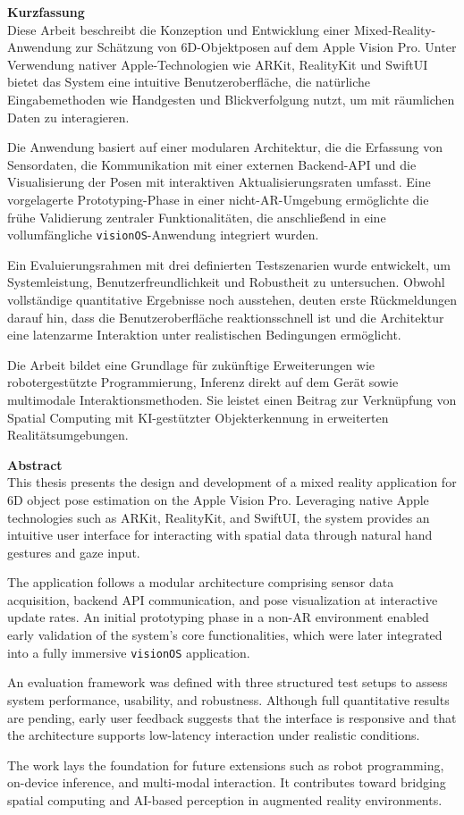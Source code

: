 \textbf{\Large Kurzfassung}\\

Diese Arbeit beschreibt die Konzeption und Entwicklung einer Mixed-Reality-Anwendung zur Schätzung von 6D-Objektposen auf dem Apple Vision Pro. Unter Verwendung nativer Apple-Technologien wie ARKit, RealityKit und SwiftUI bietet das System eine intuitive Benutzeroberfläche, die natürliche Eingabemethoden wie Handgesten und Blickverfolgung nutzt, um mit räumlichen Daten zu interagieren.

Die Anwendung basiert auf einer modularen Architektur, die die Erfassung von Sensordaten, die Kommunikation mit einer externen Backend-API und die Visualisierung der Posen mit interaktiven Aktualisierungsraten umfasst. Eine vorgelagerte Prototyping-Phase in einer nicht-AR-Umgebung ermöglichte die frühe Validierung zentraler Funktionalitäten, die anschließend in eine vollumfängliche \texttt{visionOS}-Anwendung integriert wurden.

Ein Evaluierungsrahmen mit drei definierten Testszenarien wurde entwickelt, um Systemleistung, Benutzerfreundlichkeit und Robustheit zu untersuchen. Obwohl vollständige quantitative Ergebnisse noch ausstehen, deuten erste Rückmeldungen darauf hin, dass die Benutzeroberfläche reaktionsschnell ist und die Architektur eine latenzarme Interaktion unter realistischen Bedingungen ermöglicht.

Die Arbeit bildet eine Grundlage für zukünftige Erweiterungen wie robotergestützte Programmierung, Inferenz direkt auf dem Gerät sowie multimodale Interaktionsmethoden. Sie leistet einen Beitrag zur Verknüpfung von Spatial Computing mit KI-gestützter Objekterkennung in erweiterten Realitätsumgebungen.

\vspace{1em}
\newpage
\textbf{\Large Abstract}\\

This thesis presents the design and development of a mixed reality application for 6D object pose estimation on the Apple Vision Pro. Leveraging native Apple technologies such as ARKit, RealityKit, and SwiftUI, the system provides an intuitive user interface for interacting with spatial data through natural hand gestures and gaze input.

The application follows a modular architecture comprising sensor data acquisition, backend API communication, and pose visualization at interactive update rates. An initial prototyping phase in a non-AR environment enabled early validation of the system’s core functionalities, which were later integrated into a fully immersive \texttt{visionOS} application.

An evaluation framework was defined with three structured test setups to assess system performance, usability, and robustness. Although full quantitative results are pending, early user feedback suggests that the interface is responsive and that the architecture supports low-latency interaction under realistic conditions.

The work lays the foundation for future extensions such as robot programming, on-device inference, and multi-modal interaction. It contributes toward bridging spatial computing and AI-based perception in augmented reality environments.
